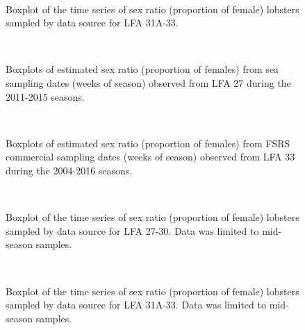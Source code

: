 \documentclass[11pt]{article}
\newcommand{\e}{/backup/bio_data/bio.lobster/figures/} %
\begin{document}
\begin{figure}
        \centering
         \\
                    \caption{Boxplot of the time series of sex ratio (proportion of female) lobsters sampled by data source for LFA 31A-33. }
        \end{figure}

\begin{figure}
        \centering
         \\
                     \caption{Boxplots of estimated sex ratio (proportion of females) from sea sampling dates (weeks of season) observed from LFA 27 during the 2011-2015 seasons. }
        \end{figure}



\begin{figure}
        \centering
         \\
                     \caption{Boxplots of estimated sex ratio (proportion of females) from FSRS commercial sampling dates (weeks of season) observed from LFA 33 during the 2004-2016 seasons. }
        \end{figure}


\iffalse
\begin{figure}
        \centering
         \\
                     \caption{Boxplot of the time series of sex ratio (proportion of female) lobsters sampled by data source for LFA 27-30. Data was limited to mid-season samples.}
        \end{figure}

\begin{figure}
        \centering
         \\
                    \caption{Boxplot of the time series of sex ratio (proportion of female) lobsters sampled by data source for LFA 31A-33. Data was limited to mid-season samples.}
        \end{figure}
\end{document}
